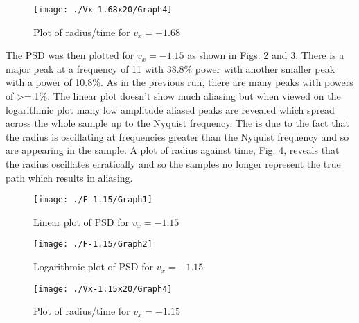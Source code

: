 \documentclass[a4paper,12pt]{article}
\begin{document}
\begin{figure}[H]
\centering
\texttt{[image: ./Vx-1.68x20/Graph4]}
\caption{Plot of radius/time for $v_x=-1.68$}
\label{fig:radius3}
\end{figure}

The PSD was then plotted for $v_x=-1.15$ as shown in Figs. \ref{fig:psd7} and \ref{fig:psd8}. There is a major peak at a frequency of 11 with 38.8\% power with another smaller peak with a power of 10.8\%. As in the previous run, there are many peaks with powers of \textgreater=.1\%. The linear plot doesn't show much aliasing but when viewed on the logarithmic plot many low amplitude aliased peaks are revealed which spread across the whole sample up to the Nyquist frequency. The is due to the fact that the radius is oscillating at frequencies greater than the Nyquist frequency and so are appearing in the sample. A plot of radius against time, Fig. \ref{fig:radius4}, reveals that the radius oscillates erratically and so the samples no longer represent the true path which results in aliasing.

\begin{figure}[H]
\centering
\texttt{[image: ./F-1.15/Graph1]}
\caption{Linear plot of PSD for $v_x=-1.15$}
\label{fig:psd7}
\end{figure}

\begin{figure}[H]
\centering
\texttt{[image: ./F-1.15/Graph2]}
\caption{Logarithmic plot of PSD for $v_x=-1.15$}
\label{fig:psd8}
\end{figure}

\begin{figure}[H]
\centering
\texttt{[image: ./Vx-1.15x20/Graph4]}
\caption{Plot of radius/time for $v_x=-1.15$}
\label{fig:radius4}
\end{figure}
\end{document}
